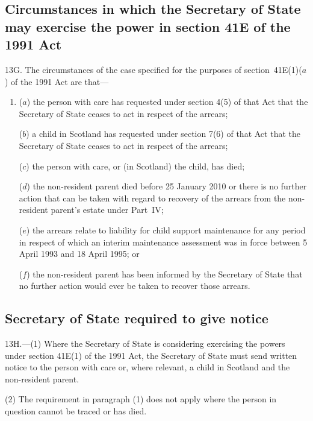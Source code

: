 \documentclass[12pt,a4paper]{article}
\begin{document}
\subsection[13G. Circumstances in which the Secretary of State may exercise the power in section 41E of the 1991 Act]{Circumstances in which the Secretary of State may exercise the power in section 41E of the 1991 Act}

\begin{sloppypar}
13G.  The circumstances of the case specified for the purposes of section~41E(1)($a$)  of the 1991 Act are that—
\end{sloppypar}
\begin{enumerate}\item[]
($a$) the person with care has requested under section 4(5) of that Act that the Secretary of State ceases to act in respect of the arrears;

($b$) a child in Scotland has requested under section 7(6) of that Act that the Secretary of State ceases to act in respect of the arrears;

($c$) the person with care, or (in Scotland) the child, has died;

($d$) the non-resident parent died before 25 January 2010 or there is no further action that can be taken with regard to recovery of the arrears from the non-resident parent’s estate under Part~IV;

($e$) the arrears relate to liability for child support maintenance for any period in respect of which an interim maintenance assessment was in force between 5 April 1993 and 18 April 1995; or

($f$) the non-resident parent has been informed by the Secretary of State that no further action would ever be taken to recover those arrears.
\end{enumerate}

\subsection[13H. Secretary of State required to give notice]{Secretary of State required to give notice}

13H.---(1)  Where the Secretary of State is considering exercising the powers under section 41E(1) of the 1991 Act, the Secretary of State must send written notice to the person with care or, where relevant, a child in Scotland and the non-resident parent.

(2) The requirement in paragraph (1) does not apply where the person in question cannot be traced or has died.
\end{document}
